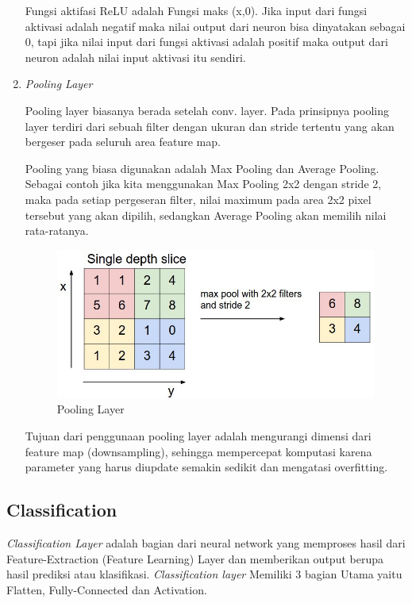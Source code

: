 \begin{enumerate}
	Fungsi aktifasi ReLU adalah Fungsi maks (x,0). Jika input dari fungsi aktivasi adalah negatif maka nilai output dari neuron bisa dinyatakan sebagai 0, tapi jika nilai input dari fungsi aktivasi adalah positif maka output dari neuron adalah nilai input aktivasi itu sendiri.
	
	\item \textit{Pooling Layer}
	
	Pooling layer biasanya berada setelah conv. layer. Pada prinsipnya pooling layer terdiri dari sebuah filter dengan ukuran dan stride tertentu yang akan bergeser pada seluruh area feature map.
	
	Pooling yang biasa digunakan adalah Max Pooling dan Average Pooling. Sebagai contoh jika kita menggunakan Max Pooling 2x2 dengan stride 2, maka pada setiap pergeseran filter, nilai maximum pada area 2x2 pixel tersebut yang akan dipilih, sedangkan Average Pooling akan memilih nilai rata-ratanya.
	
	\begin{figure}[h]
		\centering
		
		\includegraphics[width=0.7\columnwidth]{gambar/poolinglayer.jpeg}
		
		\caption{Pooling Layer\citep{cit:cnn}}
		\label{fig:poolinglayer}
	\end{figure}	
	
	Tujuan dari penggunaan pooling layer adalah mengurangi dimensi dari feature map (downsampling), sehingga mempercepat komputasi karena parameter yang harus diupdate semakin sedikit dan mengatasi overfitting.
\end{enumerate}

\vspace{2ex}
\subsection{Classification}
\label{subsec:classification}

\textit{Classification Layer} adalah bagian dari neural network yang memproses hasil dari Feature-Extraction (Feature Learning) Layer dan memberikan output berupa hasil prediksi atau klasifikasi. \textit{Classification layer} Memiliki 3 bagian Utama yaitu Flatten, Fully-Connected dan Activation.

